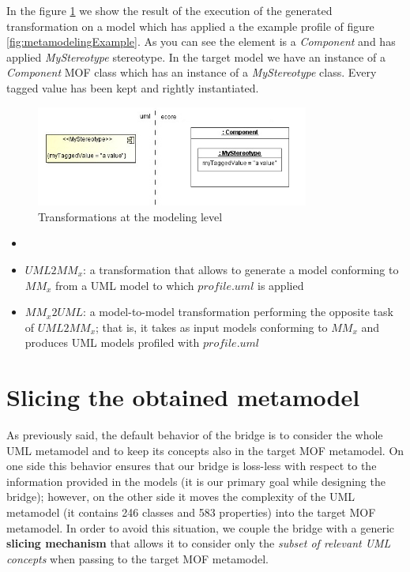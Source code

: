 In the figure \ref{fig:modelingExample} we show the result of the execution of the generated transformation on a model which has applied a the example profile of figure \ref{fig:metamodelingExample}. As you can see the element is a \textit{Component} and has applied \textit{MyStereotype} stereotype. In the target model we have an instance of a \textit{Component} MOF class which has an instance of a \textit{MyStereotype} class. Every tagged value has been kept and rightly instantiated.
%
\begin{figure}[htbp]
	\centering
		\includegraphics[width=0.80\textwidth]{figures/modelingExample.jpg}
	\caption{Transformations at the modeling level}
	\label{fig:modelingExample}
\end{figure}
%


\begin{itemize}
	\item 
	\item $UML2MM_x$: a transformation that allows to generate a model conforming 
	to $MM_x$ from a UML model to which $profile.uml$ is applied 
	\item $MM_x2UML$: a model-to-model transformation performing the opposite task of $UML2MM_x$; that is, it takes as input models
	conforming to $MM_x$ and produces UML models profiled with $profile.uml$
\end{itemize}

\section{Slicing the obtained metamodel}\label{sec:slicing}

As previously said, the default behavior of the bridge is to consider the whole UML metamodel and to keep its concepts also in the
target MOF metamodel. On one side this behavior ensures that our bridge is loss-less with respect to the information
provided in the models (it is our primary goal while designing the bridge);
however, on the other side it moves the complexity of the UML metamodel (it contains 246 classes and 583 properties)
into the target MOF metamodel. 
In order to avoid this situation, we couple the bridge with a generic \textbf{slicing mechanism} that allows it to consider  
only the \textit{subset of relevant UML concepts} when passing to the target MOF metamodel.

